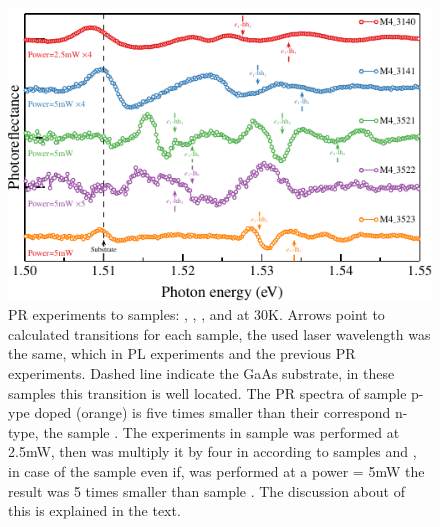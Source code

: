 \begin{figure}[ht!]
	\centering
	\includegraphics[width=\textwidth]{../figures/chapter-3/pr-plots/build-ruco/pr-set2.pdf}
	\caption{ PR experiments to samples: , , ,  and  at 30K. Arrows point to calculated transitions for each sample, the used laser wavelength was the same, which in PL experiments and the previous PR experiments. Dashed line indicate the GaAs substrate, in these samples this transition is well located.  The PR spectra of sample  p-ype doped (orange) is five times smaller  than their correspond n-type, the sample . The experiments in sample  was performed at 2.5mW, then was multiply it by four in according to samples  and , in case of the sample even if,  was performed at a power = 5mW the result was 5 times smaller than sample . The discussion about of this is explained in the text. }
	\label{fig:chapter-3-PR-PLOT-SET2}
\end{figure}

